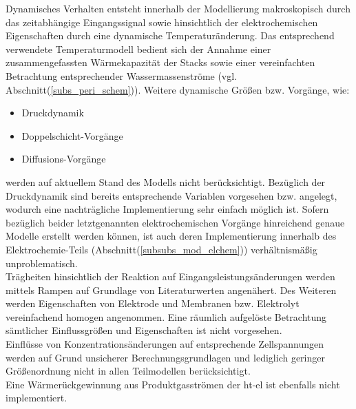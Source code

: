 \documentclass[onecolumn,10pt,titlepage]{article}
\begin{document}
Dynamisches Verhalten entsteht innerhalb der Modellierung makroskopisch durch das zeitabhängige Eingangssignal sowie hinsichtlich der elektrochemischen Eigenschaften durch eine dynamische Temperaturänderung. Das entsprechend verwendete Temperaturmodell bedient sich der Annahme einer zusammengefassten Wärmekapazität der Stacks sowie einer vereinfachten Betrachtung entsprechender Wassermassenströme (vgl. Abschnitt(\ref{subs_peri_schem})). Weitere dynamische Größen bzw. Vorgänge, wie:
\begin{itemize}
	\item Druckdynamik 
	\item Doppelschicht-Vorgänge
	\item Diffusions-Vorgänge 
\end{itemize}
werden auf aktuellem Stand des Modells nicht berücksichtigt. Bezüglich der Druckdynamik sind bereits entsprechende Variablen vorgesehen bzw. angelegt, wodurch eine nachträgliche Implementierung sehr einfach möglich ist. Sofern bezüglich beider letztgenannten elektrochemischen Vorgänge hinreichend genaue Modelle erstellt werden können, ist auch deren Implementierung innerhalb des Elektrochemie-Teils (Abschnitt(\ref{subsubs_mod_elchem})) verhältnismäßig unproblematisch.\\
Trägheiten hinsichtlich der Reaktion auf Eingangsleistungsänderungen werden mittels Rampen auf Grundlage von Literaturwerten \cite{Buttler.2018} angenähert. 
Des Weiteren werden Eigenschaften von Elektrode und Membranen bzw. Elektrolyt vereinfachend homogen angenommen. Eine räumlich aufgelöste Betrachtung sämtlicher Einflussgrößen und Eigenschaften ist nicht vorgesehen.\\ 
Einflüsse von Konzentrationsänderungen auf entsprechende Zellspannungen werden auf Grund unsicherer Berechnungsgrundlagen und lediglich geringer Größenordnung nicht in allen Teilmodellen berücksichtigt.\\
Eine Wärmerückgewinnung aus Produktgasströmen der \gls{ht}-\gls{el} ist ebenfalls nicht implementiert.\\

%
%
%
%
\end{document}
